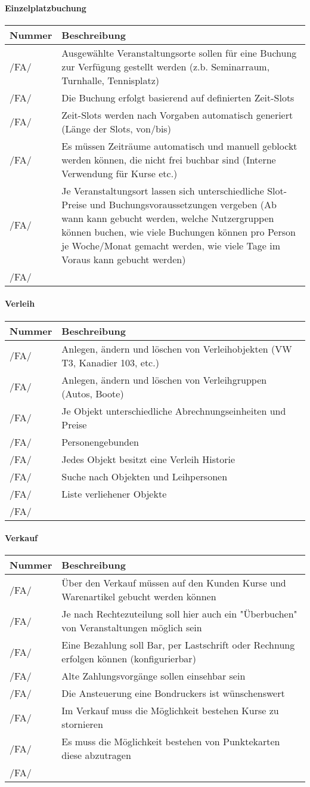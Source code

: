 \documentclass[a4paper,12pt]{article}
\newcommand\addrow[2]{#1 &#2\\ }
\newcommand\addheading[2]{#1 &#2\\ \hline}
\newcommand\tabularhead{\begin{tabular}{lp{13cm}}
\hline
}
\newenvironment{usecase}{\tabularhead}
{\hline\end{tabular}}
\begin{document}
\paragraph{\textbf{Einzelplatzbuchung}\\}
\begin{usecase}
  \addheading{Nummer}{Beschreibung} 
  \addrow{/FA/}{Ausgewählte Veranstaltungsorte sollen für eine Buchung zur Verfügung gestellt werden (z.b. Seminarraum, Turnhalle, Tennisplatz)}
  \addrow{/FA/}{Die Buchung erfolgt basierend auf definierten Zeit-Slots}
  \addrow{/FA/}{Zeit-Slots werden nach Vorgaben automatisch generiert (Länge der Slots, von/bis)}
  \addrow{/FA/}{Es müssen Zeiträume automatisch und manuell geblockt werden können, die nicht frei buchbar sind (Interne Verwendung für Kurse etc.)}
  \addrow{/FA/}{Je Veranstaltungsort lassen sich unterschiedliche Slot-Preise und Buchungsvoraussetzungen vergeben (Ab wann kann gebucht werden, welche Nutzergruppen können buchen, wie viele Buchungen können pro Person je Woche/Monat gemacht werden, wie viele Tage im Voraus kann gebucht werden)}
  \addrow{/FA/}{}
\end{usecase}

\paragraph{\textbf{Verleih}\\}
\begin{usecase}
  \addheading{Nummer}{Beschreibung} 
  \addrow{/FA/}{Anlegen, ändern und löschen von Verleihobjekten (VW T3, Kanadier 103, etc.)}
  \addrow{/FA/}{Anlegen, ändern und löschen von Verleihgruppen (Autos, Boote)}
  \addrow{/FA/}{Je Objekt unterschiedliche Abrechnungseinheiten und Preise}
  \addrow{/FA/}{Personengebunden}
  \addrow{/FA/}{Jedes Objekt besitzt eine Verleih Historie}
  \addrow{/FA/}{Suche nach Objekten und Leihpersonen}
  \addrow{/FA/}{Liste verliehener Objekte}
  \addrow{/FA/}{}
\end{usecase}

\paragraph{\textbf{Verkauf}\\}
\begin{usecase}
  \addheading{Nummer}{Beschreibung} 
  \addrow{/FA/}{Über den Verkauf müssen auf den Kunden Kurse und Warenartikel gebucht werden können}
  \addrow{/FA/}{Je nach Rechtezuteilung soll hier auch ein "Überbuchen" von Veranstaltungen möglich sein}
  \addrow{/FA/}{Eine Bezahlung soll Bar, per Lastschrift oder Rechnung erfolgen können (konfigurierbar)}
  \addrow{/FA/}{Alte Zahlungsvorgänge sollen einsehbar sein}
  \addrow{/FA/}{Die Ansteuerung eine Bondruckers ist wünschenswert}
  \addrow{/FA/}{Im Verkauf muss die Möglichkeit bestehen Kurse zu stornieren}
  \addrow{/FA/}{Es muss die Möglichkeit bestehen von Punktekarten diese abzutragen}
  \addrow{/FA/}{}
\end{usecase}
\end{document}
